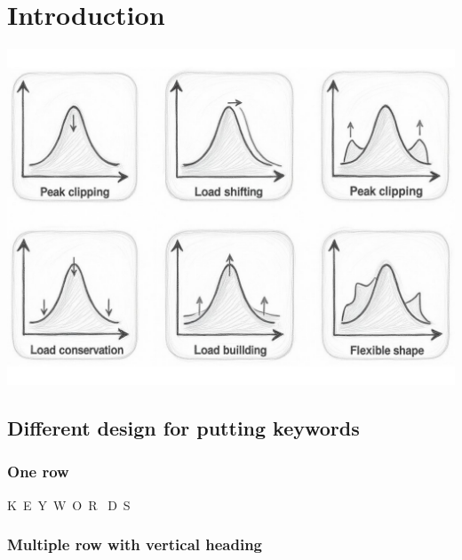 \chapter{Introduction}
\label{chapter-1}
\vfill
\begin{center}
    \includegraphics[width=\textwidth]{figures/chapter_1/type_flex_sketch.pdf}
\end{center}
\newpage
\section{Different design for putting keywords}
\subsection{One row}
\noindent
K\ E\ Y\ W\ O\ R \ D\ S

\noindent
{} \hfill
{} \hfill
{} \hfill
{}

\vspace{1 em}
\noindent
\subsection{Multiple row with vertical heading}

